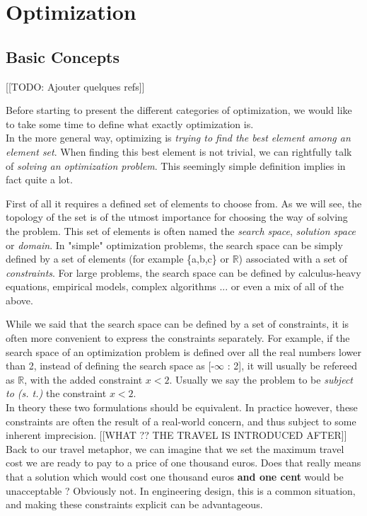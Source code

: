 
\part{Optimization}

\chapter{Basic Concepts}

[[TODO: Ajouter quelques refs]]

Before starting to present the different categories of optimization, we would like to take some time to define what exactly optimization is.\\
In the more general way, optimizing is \emph{trying to find the best element among an element set}. When finding this best element is not trivial, we can rightfully talk of \emph{solving an optimization problem}. This seemingly simple definition implies in fact quite a lot.

First of all it requires a defined set of elements to choose from. As we will see, the topology of the set is of the utmost importance for choosing the way of solving the problem. This set of elements is often named the \emph{search space}, \emph{solution space} or \emph{domain}. In "simple" optimization problems, the search space can be simply defined by a set of elements (for example \{a,b,c\} or \ensuremath{\mathbb{R}}) associated with a set of \emph{constraints}. For large problems, the search space can be defined by calculus-heavy equations, empirical models, complex algorithms ... or even a mix of all of the above.


While we said that the search space can be defined by a set of constraints, it is often more convenient to express the constraints separately. For example, if the search space of an optimization problem is defined over all the real numbers lower than 2, instead of defining the search space as [-\(\infty\) : 2], it will usually be refereed as \(\mathbb{R}\), with the added constraint \(x < 2\). Usually we say the problem to be \emph{subject to (s. t.)} the constraint \(x < 2\).\\
In theory these two formulations should be equivalent. In practice however, these constraints are often the result of a real-world concern, and thus subject to some inherent imprecision. [[WHAT ?? THE TRAVEL IS INTRODUCED AFTER]] Back to our travel metaphor, we can imagine that we set the maximum travel cost we are ready to pay to a price of one thousand euros. Does that really means that a solution which would cost one thousand euros \textbf{and one cent} would be unacceptable ? Obviously not. In engineering design, this is a common situation, and making these constraints explicit can be advantageous.

